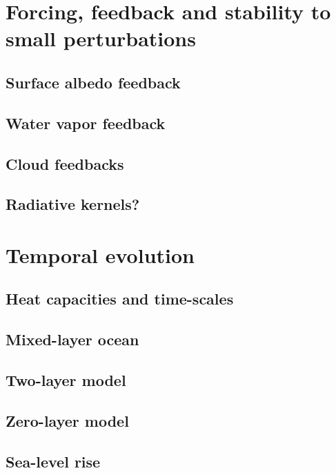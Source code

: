 \documentclass[12pt]{book}
\begin{document}
\chapter{Forcing, feedback and stability to small perturbations}



\section{Surface albedo feedback}
\section{Water vapor feedback}
\section{Cloud feedbacks}
\section{Radiative kernels?}

\chapter{Temporal evolution}
\section{Heat capacities and time-scales}
\section{Mixed-layer ocean}
\section{Two-layer model}
\section{Zero-layer model}
\section{Sea-level rise}
\end{document}
